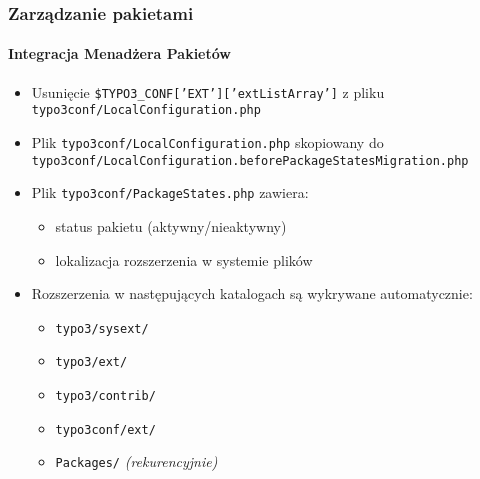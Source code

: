
\begin{frame}[fragile]
	\frametitle{Zarządzanie pakietami}
	\framesubtitle{Integracja Menadżera Pakietów}
	\begin{itemize}
		\item Usunięcie \texttt{\$TYPO3\_CONF['EXT']['extListArray']} z pliku\newline
			\smaller\texttt{typo3conf/LocalConfiguration.php}\normalsize

		\item Plik \small\texttt{typo3conf/LocalConfiguration.php} skopiowany do\normalsize\newline
			\smaller\texttt{typo3conf/LocalConfiguration.beforePackageStatesMigration.php}\normalsize

		\item Plik \texttt{typo3conf/PackageStates.php} zawiera:

			\begin{itemize}
				\item status pakietu (aktywny/nieaktywny)
				\item lokalizacja rozszerzenia w systemie plików
			\end{itemize}

		\item Rozszerzenia w następujących katalogach są wykrywane automatycznie:

			\begin{itemize}
				\item \texttt{typo3/sysext/}
				\item \texttt{typo3/ext/}
				\item \texttt{typo3/contrib/}
				\item \texttt{typo3conf/ext/}
				\item \texttt{Packages/} \emph{(rekurencyjnie)}
			\end{itemize}

	\end{itemize}

\end{frame}


